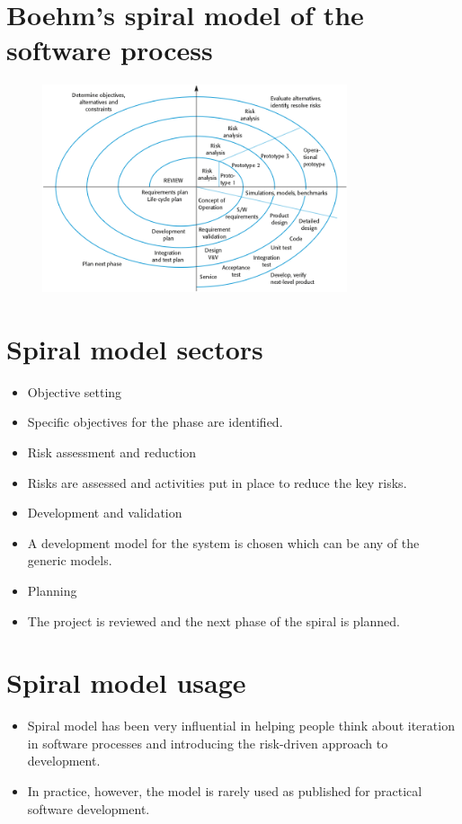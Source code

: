\section{Boehm’s spiral model of the software process}
\begin{figure}[h!]
    \centering
    \includegraphics[width = 0.8\textwidth]{./figures/L1_11.png}
    \caption{}
    \label{fig:L1_11}
\end{figure}



\section{Spiral model sectors}
\begin{itemize}
\item Objective setting

\item Specific objectives for the phase are identified. \item Risk assessment and reduction
\item Risks are assessed and activities put in place to reduce the key risks.

\item Development and validation

\item A development model for the system is chosen which can be any of the generic models.

\item Planning

\item The project is reviewed and the next phase of the spiral is planned.
\end{itemize}

\section{Spiral model usage}
\begin{itemize}

\item Spiral model has been very influential in helping people think about iteration in software processes and introducing the risk-driven approach to development.

\item In practice, however, the model is rarely used as published for practical software development.
\end{itemize}

